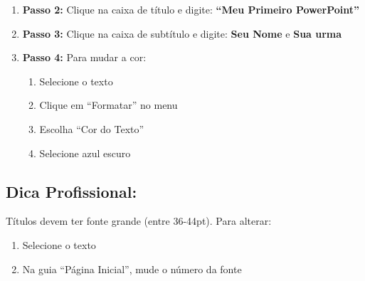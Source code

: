 \documentclass[11pt]{article}
\begin{document}
\begin{multicols}{2}
\begin{enumerate}
\item \textbf{Passo 2:} Clique na caixa de título e digite: \textbf{``Meu Primeiro PowerPoint''}

\item \textbf{Passo 3:} Clique na caixa de subtítulo e digite: \textbf{Seu Nome} e \textbf{Sua urma}

\item \textbf{Passo 4:} Para mudar a cor:
\begin{enumerate}
\item Selecione o texto
\item Clique em ``Formatar'' no menu
\item Escolha ``Cor do Texto''
\item Selecione azul escuro
\end{enumerate}
\end{enumerate}

\subsection*{Dica Profissional:}
Títulos devem ter fonte grande (entre 36-44pt). Para alterar:
\begin{enumerate}
\item Selecione o texto
\item Na guia ``Página Inicial'', mude o número da fonte
\end{enumerate}

\end{multicols}
\end{document}
